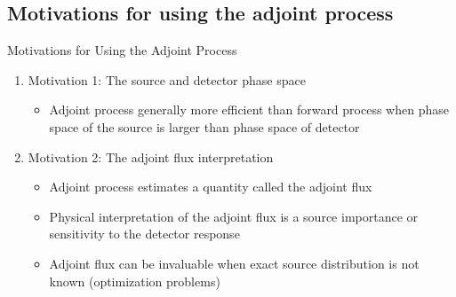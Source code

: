 \documentclass{beamer}
\begin{document}
\subsection{Motivations for using the adjoint process}
\begin{frame}{Motivations for Using the Adjoint Process}

  \begin{enumerate}
    \item Motivation 1: The source and detector phase space
      \smallskip
      \begin{itemize}
        \item Adjoint process generally more efficient than forward 
          process when phase space of the source is larger than phase 
          space of detector
      \end{itemize}
      \bigskip
      \bigskip
    \item Motivation 2: The adjoint flux interpretation
      \smallskip
      \begin{itemize}
        \item Adjoint process estimates a quantity called the adjoint flux
          \medskip
        \item Physical interpretation of the adjoint flux is a source 
          importance or sensitivity to the detector response
          \medskip
        \item Adjoint flux can be invaluable when exact source 
          distribution is not known (optimization problems)
      \end{itemize}
  \end{enumerate}

\end{frame}
\end{document}
